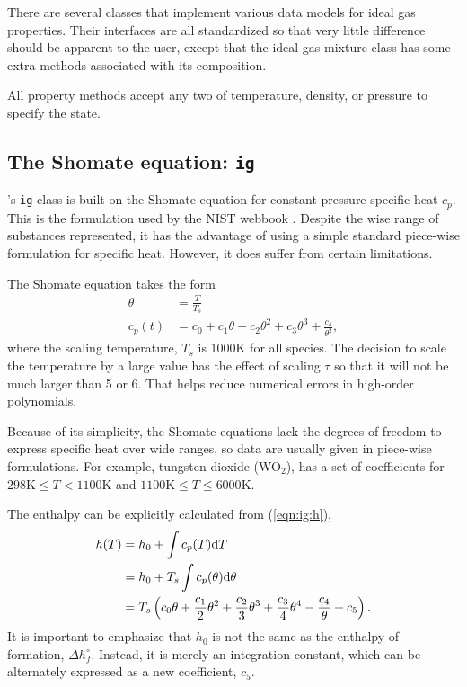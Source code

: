 There are several classes that implement various data models for ideal gas properties.  Their interfaces are all standardized so that very little difference should be apparent to the user, except that the ideal gas mixture class has some extra methods associated with its composition.

All property methods accept any two of temperature, density, or pressure to specify the state.

\subsection{The Shomate equation: \texttt{ig}}\label{sec:ig:ig}

\PM's \texttt{ig} class is built on the Shomate equation for constant-pressure specific heat $c_p$.  This is the formulation used by the NIST webbook \cite{nist:webbook}.  Despite the wise range of substances represented, it has the advantage of using a simple standard piece-wise formulation for specific heat.  However, it does suffer from certain limitations.

The Shomate equation takes the form
\begin{align}
\theta &= \frac{T}{T_s}\\
c_p(t) &= c_0 + c_1 \theta + c_2 \theta^2 + c_3 \theta^3 + \frac{c_4}{\theta^2},
\end{align}
where the scaling temperature, $T_s$ is 1000K for all species.  The decision to scale the temperature by a large value has the effect of scaling $\tau$ so that it will not be much larger than 5 or 6.  That helps reduce numerical errors in high-order polynomials.

Because of its simplicity, the Shomate equations lack the degrees of freedom to express specific heat over wide ranges, so data are usually given in piece-wise formulations.  For example, tungsten dioxide (WO$_2$), has a set of coefficients for $298\mathrm{K} \le T < 1100\mathrm{K}$ and $1100\mathrm{K} \le T \le 6000\mathrm{K}$.

The enthalpy can be explicitly calculated from (\ref{eqn:ig:h}),
\begin{align}
h(T) &= h_0 + \int c_p(T) \mathrm{d} T \nonumber\\
 &= h_0 + T_s \int c_p(\theta) \mathrm{d} \theta \nonumber\\
 &= T_s \left(c_0 \theta + \frac{c_1}{2} \theta^2 + \frac{c_2}{3} \theta^3 + \frac{c_3}{4} \theta^4 - \frac{c_4}{\theta} + c_5 \right).
\end{align}
It is important to emphasize that $h_0$ is not the same as the enthalpy of formation, $\Delta h^\circ_f$.  Instead, it is merely an integration constant, which can be alternately expressed as a new coefficient, $c_5$.

